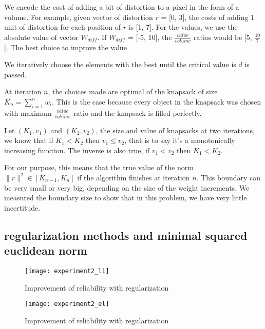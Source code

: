 \documentclass{article} %
\begin{document}
We encode the cost of adding a bit of distortion to a pixel in the form of a
volume. For example, given vector of distortion $r$ = [0, 3], the costs of
adding 1 unit of distortion for each position of $r$ is [1, 7]. For the values,
we use the absolute value of vector $W_{diff}$. If $W_{diff}$ = [-5, 10], the 
$\frac {value} {volume}$ ratios would be [5, $\frac{10}{7}$]. The best choice
to improve the value 

We iteratively choose the elements with the best until
the critical value is $d$ is passed.

At iteration $n$, the choices made are optimal of the knapsack of size
$K_n = \sum\limits_{i=1}^n w_i$. This is the case because every object in the
knapsack was chosen with maximum $\frac{value} {volume}$ ratio and the knapsack
is filled perfectly.

Let $(K_1, v_1)$ and $(K_2, v_2)$, the size and value of knapsacks at two
iterations, we know that if $K_1 < K_2$ then $v_1 \leq v_2$, that is to say
it's a monotonically increasing function. The inverse is also true, if
$v_1 < v_2$ then $K_1 < K_2$.

For our purpose, this means that the true value of the norm
$\lVert{r} \rVert^2 \in [K_{n-1}, K_n]$ if the algorithm finishes at iteration
$n$. This boundary can be very small or very big, depending on the size of the
weight increments. We measured the boundary size to show that in this problem,
we have very little incertitude.


\subsection{regularization methods and minimal squared euclidean norm}

\begin{figure}[h!]
\texttt{[image: experiment2\_l1]}
\caption{\small Improvement of reliability with regularization}
\end{figure}


\begin{figure}[h!]
\texttt{[image: experiment2\_el]}
\caption{\small Improvement of reliability with regularization}
\end{figure}
\end{document}
